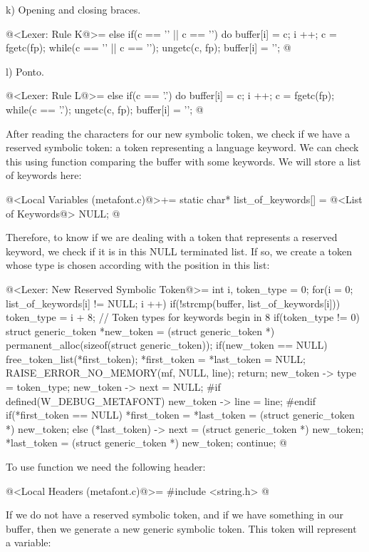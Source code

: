 k) Opening and closing braces.

\iniciocodigo
@<Lexer: Rule K@>=
else if(c == '{' || c == '}'){
  do{
    buffer[i] = c;
    i ++;
    c = fgetc(fp);
  } while(c == '{' || c == '}');
  ungetc(c, fp);
  buffer[i] = '\0';
}
@
\fimcodigo

l) Ponto.

\iniciocodigo
@<Lexer: Rule L@>=
else if(c == '.'){
  do{
    buffer[i] = c;
    i ++;
    c = fgetc(fp);
  } while(c == '.');
  ungetc(c, fp);
  buffer[i] = '\0';
}
@
\fimcodigo


After reading the characters for our new symbolic token, we check if
we have a reserved symbolic token: a token representing a language
keyword. We can check this using function 
comparing the buffer with some keywords. We will store a list of
keywords here:

\iniciocodigo
@<Local Variables (metafont.c)@>+=
static char* list_of_keywords[] = {
@<List of Keywords@>
  NULL};
@
\fimcodigo

Therefore, to know if we are dealing with a token that represents a
reserved keyword, we check if it is in this NULL terminated list. If
so, we create a token whose type is chosen according with the position
in this list:

\iniciocodigo
@<Lexer: New Reserved Symbolic Token@>=
{
  int i, token_type = 0;
  for(i = 0; list_of_keywords[i] != NULL; i ++)
    if(!strcmp(buffer, list_of_keywords[i]))
      token_type = i + 8; // Token types for keywords begin in 8
  if(token_type != 0){
    struct generic_token *new_token =
       (struct generic_token *) permanent_alloc(sizeof(struct generic_token));
    if(new_token == NULL){
      free_token_list(*first_token);
      *first_token = *last_token = NULL;
      RAISE_ERROR_NO_MEMORY(mf, NULL, line);
      return;
    }
    new_token -> type = token_type;
    new_token -> next = NULL;
#if defined(W_DEBUG_METAFONT)
    new_token -> line = line;
#endif
    if(*first_token == NULL)
      *first_token = *last_token = (struct generic_token *) new_token;
    else{
      (*last_token) -> next = (struct generic_token *) new_token;
      *last_token = (struct generic_token *) new_token;
    }
    continue;
  }
}
@
\fimcodigo

To use function  we need the following header:

\iniciocodigo
@<Local Headers (metafont.c)@>=
#include <string.h>
@
\fimcodigo


If we do not have a reserved symbolic token, and if we have something
in our buffer, then we generate a new generic symbolic token. This
token will represent a variable:


